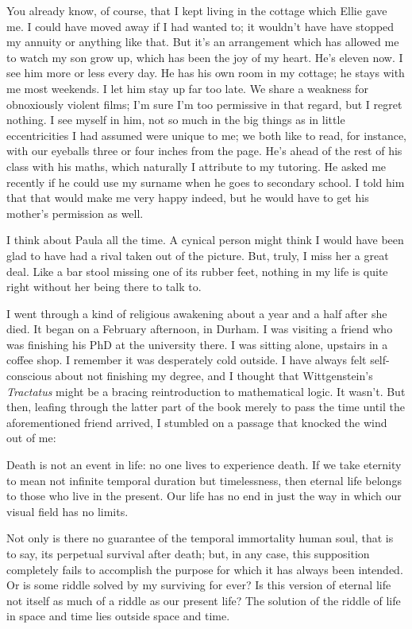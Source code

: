 You already know, of course, that I kept living in the cottage which Ellie gave me. I could have moved away if I had wanted to; it wouldn't have have stopped my annuity or anything like that. But it's an arrangement which has allowed me to watch my son grow up, which has been the joy of my heart. He's eleven now. I see him more or less every day. He has his own room in my cottage; he stays with me most weekends. I let him stay up far too late. We share a weakness for obnoxiously violent films; I'm sure I'm too permissive in that regard, but I regret nothing. I see myself in him, not so much in the big things as in little eccentricities I had assumed were unique to me; we both like to read, for instance, with our eyeballs three or four inches from the page. He's ahead of the rest of his class with his maths, which naturally I attribute to my tutoring. He asked me recently if he could use my surname when he goes to secondary school. I told him that that would make me very happy indeed, but he would have to get his mother's permission as well.

I think about Paula all the time. A cynical person might think I would have been glad to have had a rival taken out of the picture. But, truly, I miss her a great deal. Like a bar stool missing one of its rubber feet, nothing in my life is quite right without her being there to talk to.

I went through a kind of religious awakening about a year and a half after she died. It began on a February afternoon, in Durham. I was visiting a friend who was finishing his PhD at the university there. I was sitting alone, upstairs in a coffee shop. I remember it was desperately cold outside. I have always felt self-conscious about not finishing my degree, and I thought that Wittgenstein's \textit{Tractatus} might be a bracing reintroduction to mathematical logic. It wasn't. But then, leafing through the latter part of the book merely to pass the time until the aforementioned friend arrived, I stumbled on a passage that knocked the wind out of me:

\begin{quoting}
    Death is not an event in life: no one lives to experience death. If we take eternity to mean not infinite temporal duration but timelessness, then eternal life belongs to those who live in the present. Our life has no end in just the way in which our visual field has no limits.

    Not only is there no guarantee of the temporal immortality human soul, that is to say, its perpetual survival after death; but, in any case, this supposition completely fails to accomplish the purpose for which it has always been intended. Or is some riddle solved by my surviving for ever? Is this version of eternal life not itself as much of a riddle as our present life? The solution of the riddle of life in space and time lies outside space and time.
\end{quoting}

